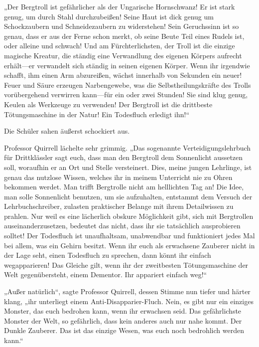 {„Der Bergtroll ist gefährlicher als der Ungarische Hornschwanz! Er ist stark genug, um durch Stahl durchzubeißen! Seine Haut ist dick genug um Schockzaubern und Schneidezaubern zu widerstehen! Sein Geruchssinn ist so genau, dass er aus der Ferne schon merkt, ob seine Beute Teil eines Rudels ist, oder alleine und schwach! Und am Fürchterlichsten, der Troll ist die einzige magische Kreatur, die ständig eine Verwandlung des eigenen Körpers aufrecht erhält—er verwandelt sich ständig in seinen eigenen Körper. Wenn ihr irgendwie schafft, ihm einen Arm abzureißen, wächst innerhalb von Sekunden ein neuer! Feuer und Säure erzeugen Narbengewebe, was die Selbstheilungskräfte des Trolls vorübergehend verwirren kann—für ein oder zwei Stunden! Sie sind klug genug, Keulen als Werkzeuge zu verwenden! Der Bergtroll ist die drittbeste Tötungsmaschine in der Natur! Ein Todesfluch erledigt ihn!“

Die Schüler sahen äußerst schockiert aus.

Professor Quirrell lächelte sehr grimmig. „Das sogenannte Verteidigungslehrbuch für Drittklässler sagt euch, dass man den Bergtroll dem Sonnenlicht aussetzen soll, woraufhin er an Ort und Stelle versteinert. Dies, meine jungen Lehrlinge, ist genau das nutzlose Wissen, welches ihr in meinem Unterricht nie zu Ohren bekommen werdet. Man trifft Bergtrolle nicht am helllichten Tag an! Die Idee, man solle Sonnenlicht benutzen, um sie aufzuhalten, entstammt dem Versuch der Lehrbuchschreiber, zulasten praktischer Belange mit ihrem Detailwissen zu prahlen. Nur weil es eine lächerlich obskure Möglichkeit gibt, sich mit Bergtrollen auseinanderzusetzen, bedeutet das nicht, dass ihr sie tatsächlich ausprobieren solltet! Der Todesfluch ist unaufhaltsam, unabwendbar und funktioniert jedes Mal bei allem, was ein Gehirn besitzt. Wenn ihr euch als erwachsene Zauberer nicht in der Lage seht, einen Todesfluch zu sprechen, dann könnt ihr einfach wegapparieren! Das Gleiche gilt, wenn ihr der zweitbesten Tötungsmaschine der Welt gegenübersteht, einem Dementor. Ihr appariert einfach weg!“

„Außer natürlich“, sagte Professor Quirrell, dessen Stimme nun tiefer und härter klang, „ihr unterliegt einem Anti-Disapparier-Fluch. Nein, es gibt nur ein einziges Monster, das euch bedrohen kann, wenn ihr erwachsen seid. Das gefährlichste Monster der Welt, so gefährlich, dass kein anderes auch nur nahe kommt. Der Dunkle Zauberer. Das ist das einzige Wesen, was euch noch bedrohlich werden kann.“

}
